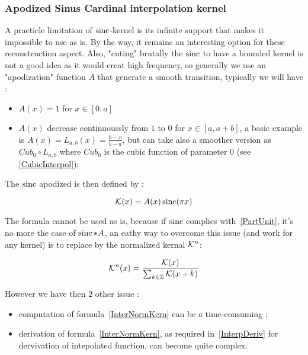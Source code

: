 \subsubsection{Apodized Sinus Cardinal interpolation kernel}
\label{SinCApodInterp}


A practicle limitation of $\operatorname{sinc}$-kernel is its infinite support that makes it impossible to use as is.  
By the way, it remains an interesting option for these reconstruction aspect.  Also, "cuting" brutally
the $\operatorname{sinc}$ to have a bounded kernel is not a good idea as it would creat high frequency, so generally
we use an "apodization" function $A$ that generate a smooth transition, typically we will have :

\begin{itemize}
    \item $A(x)=1$  for $x \in [0,a] $
    \item $A(x)$  decrease continuoussly from $1$ to $0$ for  $x \in [a,a+b] $, a basic example is
          $A(x) = L_{a,b}(x) = \frac{b-x}{b-a}$, but can take also a smoother version as $Cub_0 \circ L_{a,b}$
          where $Cub_0$ is the cubic function of parameter $0$ (see \ref{CubicInterpol});
\end{itemize}

The  $\operatorname{sinc}$ apodized is then defined by :

\begin{equation}
  \mathcal K(x)  = A(x) \operatorname{sinc}(\pi x)  \label{SinCApod}
\end{equation}

The formula cannot be used as is, because if $\operatorname{sinc}$ complies with~\ref{PartUnit}, it's no
more the case of $\operatorname{sinc} * A$, an eathy way to overcome this issue (and work for any kernel) is
to replace by the normalized kernal $\mathcal K^n$:

\begin{equation}
  \mathcal K^n(x)  =  \frac{\mathcal K(x)}{\sum_{k \in \mathbb{Z}} \mathcal K(x+k)} \label{InterNormKern}
\end{equation}

However we have then $2$ other issue :

\begin{itemize}
   \item  computation of formula~\ref{InterNormKern} can be a time-consuming ;
   \item  derivation of formula~\ref{InterNormKern}, as required in~\ref{InterpDeriv} 
          for dervivation of intepolated function, can become quite complex.
\end{itemize}

